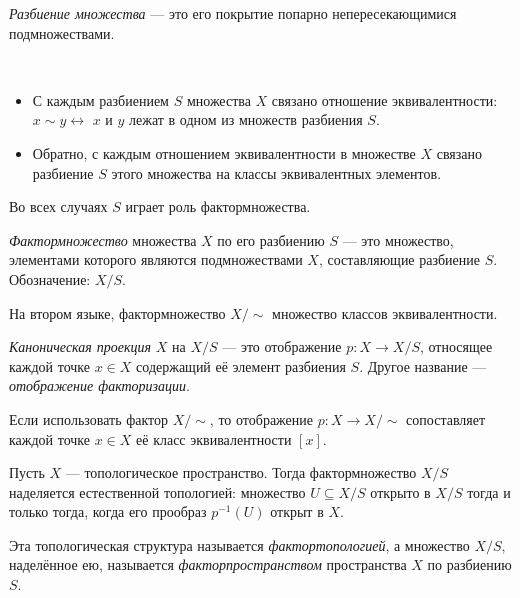 \documentclass[12pt,a4paper]{article}
\begin{document}
    \begin{definition}
        \emph{Разбиение множества} --- это его покрытие попарно непересекающимися подмножествами.
    \end{definition}

    \begin{remark*}\ 
        \begin{itemize}
            \item С каждым разбиением $S$ множества $X$ связано отношение эквивалентности: $x \sim y \leftrightarrow$ $x$ и $y$ лежат в одном из множеств разбиения $S$.
            \item Обратно, с каждым отношением эквивалентности в множестве $X$ связано разбиение $S$ этого множества на классы эквивалентных элементов.
        \end{itemize}
        Во всех случаях $S$ играет роль фактормножества.
    \end{remark*}

    \begin{definition}
        \emph{Фактормножество} множества $X$ по его разбиению $S$ --- это множество, элементами которого являются подмножествами $X$, составляющие разбиение $S$. Обозначение: $X/S$.
        
        На втором языке, фактормножество $X/{\sim}$ множество классов эквивалентности.
    \end{definition}

    \begin{definition}
        \emph{Каноническая проекция} $X$ на $X/S$ --- это отображение $p: X \to X/S$, относящее каждой точке $x \in X$ содержащий её элемент разбиения $S$. Другое название --- \emph{отображение факторизации}.
    \end{definition}

    \begin{remark*}
        Если использовать фактор $X/{\sim}$, то отображение $p: X \to X/{\sim}$ сопоставляет каждой точке $x \in X$ её класс эквивалентности $[x]$.
    \end{remark*}

    \begin{definition}
        Пусть $X$ --- топологическое пространство. Тогда фактормножество $X/S$ наделяется естественной топологией: множество $U \subseteq X/S$ открыто в $X/S$ тогда и только тогда, когда его прообраз $p^{-1}(U)$ открыт в $X$.

        Эта топологическая структура называется \emph{фактортопологией}, а множество $X/S$, наделённое ею, называется \emph{факторпространством} пространства $X$ по разбиению $S$.
    \end{definition}
\end{document}
